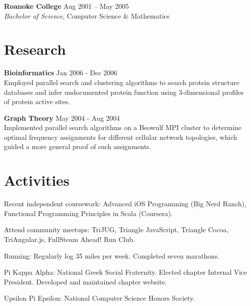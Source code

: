 \documentclass[margin,line]{resume}
\begin{document}
\begin{resume}
  \textbf{Roanoke College}\vspace{2mm} \hfill Aug 2001 -- May 2005\\
  \textsl{Bachelor of Science}, Computer Science \& Mathematics\vspace{-1mm}


  \section{\mysidestyle \textcolor{mySideColor}{Research}}

  \textbf{Bioinformatics} \hfill Jan 2006 - Dec 2006 \vspace{2mm}\\
  Employed parallel search and clustering algorithms to search protein
  structure databases and infer undocumented protein function using
  3-dimensional profiles of protein active sites.

  \textbf{Graph Theory} \hfill May 2004 - Aug 2004 \vspace{2mm}\\
  Implemented parallel search algorithms on a Beowulf MPI cluster to
  determine optimal frequency assignments for different cellular
  network topologies, which guided a more general proof of such
  assignments.



  \section{\mysidestyle \textcolor{mySideColor}{Activities}}

  Recent independent coursework: Advanced iOS Programming (Big Nerd Ranch),
Functional Programming Principles in Scala (Coursera).

  Attend community meetups: TriJUG, Triangle JavaScript, Triangle Cocoa, TriAngular.js,
FullSteam Ahead! Run Club.

  Running: Regularly log 35 miles per week. Completed seven marathons.\vspace{-2mm}

  Pi Kappa Alpha: National Greek Social Fraternity. Elected chapter
  Internal Vice President. Developed and maintained chapter
  website.\vspace{-2mm}

  Upsilon Pi Epsilon: National Computer Science Honors Society.\vspace{-2mm}

\end{resume}
\end{document}
